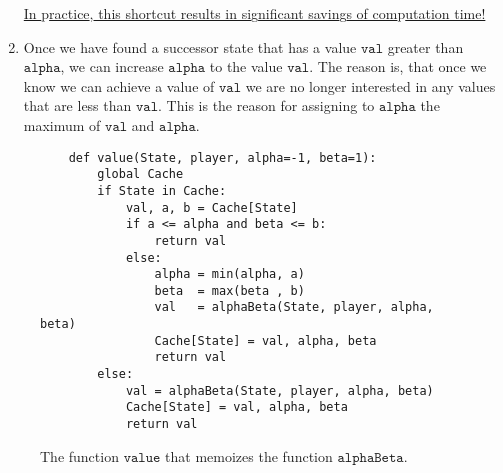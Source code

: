 \begin{enumerate}
      \underline{In }p\underline{ractice},\underline{ this shortcut results in si}g\underline{nificant savin}g\underline{s of com}p\underline{utation time!}
\item Once we have found a successor state that has a value $\texttt{val}$ greater than $\texttt{alpha}$,
      we can increase $\texttt{alpha}$ to the value $\texttt{val}$.  The reason is, that once we know we can
      achieve a value of $\texttt{val}$ we are no longer interested in any values that are less than $\texttt{val}$.
      This is the reason for assigning to $\texttt{alpha}$ the maximum of $\texttt{val}$ and $\texttt{alpha}$.
\end{enumerate}

\begin{figure}[!ht]
\centering
\begin{verbatim}
    def value(State, player, alpha=-1, beta=1):
        global Cache
        if State in Cache:
            val, a, b = Cache[State]
            if a <= alpha and beta <= b:
                return val
            else:
                alpha = min(alpha, a)
                beta  = max(beta , b)
                val   = alphaBeta(State, player, alpha, beta)
                Cache[State] = val, alpha, beta
                return val
        else:
            val = alphaBeta(State, player, alpha, beta)
            Cache[State] = val, alpha, beta
            return val                
\end{verbatim}
\caption{The function $\mathtt{value}$ that memoizes the function $\mathtt{alphaBeta}$.}
\label{fig:Alpha-Beta-Pruning.ipynb:value}
\end{figure}
\FloatBarrier

